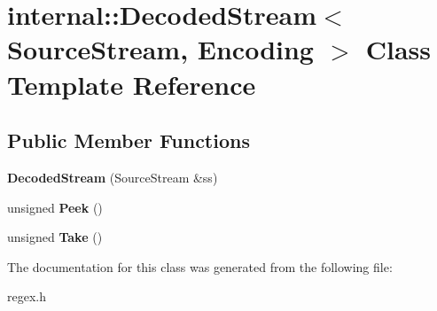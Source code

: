 \hypertarget{a00072}{}\section{internal\+:\+:Decoded\+Stream$<$ Source\+Stream, Encoding $>$ Class Template Reference}
\label{a00072}
\subsection*{Public Member Functions}
\begin{DoxyCompactItemize}
\item 
{\bfseries Decoded\+Stream} (Source\+Stream \&ss)\hypertarget{a00072_a45cf40c4e515be8aaa8cd020eaa67595}{}\label{a00072_a45cf40c4e515be8aaa8cd020eaa67595}

\item 
unsigned {\bfseries Peek} ()\hypertarget{a00072_ac78f2cbc03ae0d79a0fcfe6d56589d70}{}\label{a00072_ac78f2cbc03ae0d79a0fcfe6d56589d70}

\item 
unsigned {\bfseries Take} ()\hypertarget{a00072_a62b45969ce169bef1da0600490329857}{}\label{a00072_a62b45969ce169bef1da0600490329857}

\end{DoxyCompactItemize}


The documentation for this class was generated from the following file\+:\begin{DoxyCompactItemize}
\item 
regex.\+h\end{DoxyCompactItemize}
